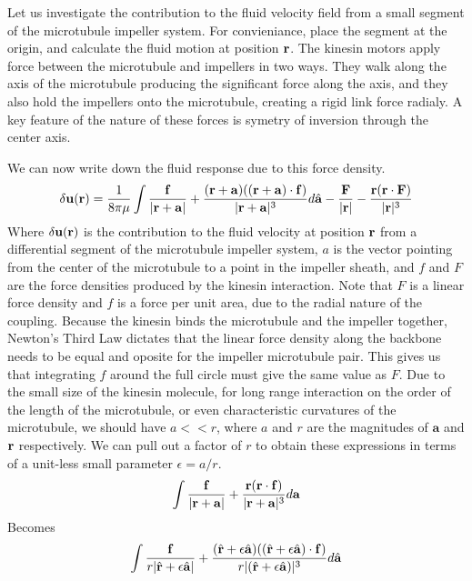 \documentclass[11pt]{ucthesis}
\def\br{{\bf r}}
\begin{document}
Let us investigate the contribution to the fluid velocity field from a small segment of the microtubule impeller system. For convieniance, place the segment at the origin, and calculate the fluid motion at position $\br$. The kinesin motors apply force between the microtubule and impellers in two ways. They walk along the axis of the microtubule producing the significant force along the axis, and they also hold the impellers onto the microtubule, creating a rigid link force radialy. A key feature of the nature of these forces is symetry of inversion through the center axis.

We can now write down the fluid response due to this force density.
\begin{equation}
\label{eq:forcedensitystart}
\delta \mathbf{u}(\br) = \frac{1}{8\pi\mu}\int \frac{ \mathbf{f}}{|\br +  \mathbf{a}|} + \frac{(\br+ \mathbf{a}) ((\br +  \mathbf{a}) \cdot  \mathbf{f})}{|\br +  \mathbf{a}|^3} d\hat{ \mathbf{a}} - \frac{ \mathbf{F}}{|\br|} - \frac{\br (\br \cdot  \mathbf{F})}{|\br|^3}
\end{equation}
Where $\delta  \mathbf{u}(\br)$ is the contribution to the fluid velocity at position $\br$ from a differential segment of the microtubule impeller system, $a$ is the vector pointing from the center of the microtubule to a point in the impeller sheath, and $f$ and $F$ are the force densities produced by the kinesin interaction. Note that $F$ is a linear force density and $f$ is a force per unit area, due to the radial nature of the coupling.
Because the kinesin binds the microtubule and the impeller together, Newton's Third Law dictates that the linear force density along the backbone needs to be equal and oposite for the impeller microtubule pair. This gives us that integrating $f$ around the full circle must give the same value as $F$.
Due to the small size of the kinesin molecule, for long range interaction on the order of the length of the microtubule, or even characteristic curvatures of the microtubule, we should have $a << r$, where $a$ and $r$ are the magnitudes of $ \mathbf{a}$ and $\br$ respectively. We can pull out a factor of $r$ to obtain these expressions in terms of a unit-less small parameter $\epsilon = a/r$.
\begin{equation}
\label{eq:forcedensitycircleonly}
\int \frac{ \mathbf{f}}{|\br +  \mathbf{a}|} + \frac{\br (\br \cdot  \mathbf{f})}{|\br +  \mathbf{a}|^3} d \mathbf{a}
\end{equation}
Becomes
\begin{equation}
\label{eq:forcedensityepsilon}
\int \frac{\bf f}{r|\hat{\br} + \epsilon \hat{ \mathbf{a}}|} + \frac{(\hat{\br} + \epsilon \hat{ \mathbf{a}}) ((\hat{\br} + \epsilon \hat{ \mathbf{a}}) \cdot  \mathbf{f})}{r|(\hat{\br} + \epsilon \hat{ \mathbf{a}})|^3} d\hat{ \mathbf{a}}
\end{equation}
\end{document}
